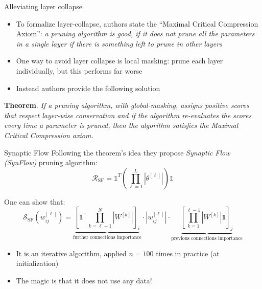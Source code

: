 \documentclass[10pt, handout]{beamer}
\begin{document}
\begin{frame}{Alleviating layer collapse}
    \begin{itemize}
        \pause\item To formalize layer-collapse, authors state the ``Maximal Critical Compression Axiom'': \textit{a pruning algorithm is good, if it does not prune all the parameters in a single layer if there is something left to prune in other layers}
        \pause\item One way to avoid layer collapse is local masking: prune each layer individually, but this performs far worse \cite{SynFlow}
        \pause\item Instead authors provide the following solution
    \end{itemize}
    \textbf{Theorem}. \textit{If a pruning algorithm, with global-masking, assigns positive scores that respect layer-wise conservation and if the algorithm re-evaluates the scores every time a parameter is pruned, then the algorithm satisfies the Maximal Critical Compression axiom.}
\end{frame}


\begin{frame}{Synaptic Flow}
    \pause
    Following the theorem's idea they propose \textit{Synaptic Flow (SynFlow)} pruning algorithm:
    \begin{equation}\label{eq:synflow-r-function}
\mathcal{R}_{\mathrm{SF}}=\mathds{1}^{T}\left(\prod_{\ell=1}^{L}\left|\theta^{[\ell]}\right|\right) \mathds{1}
\end{equation}
    
\pause
One can show that:
\begin{equation}\label{eq:synflow-score-function}
\mathcal{S}_{\mathrm{SF}}\left(w_{i j}^{[\ell]}\right)
=
\underbrace{\left[\mathds{1}^{\top} \prod_{k=\ell+1}^{N}\left|W^{[k]}\right|\right]_{i}}_{\text{further connections importance}}
\cdot
\left|w_{i j}^{[\ell]}\right|
\cdot
\underbrace{\left[\prod_{k=1}^{\ell-1}\left|W^{[k]}\right| \mathds{1}\right]_{j}}_{\text{previous connections importance}}
\end{equation}

\pause
\begin{itemize}
    \item\pause It is an iterative algorithm, applied $n=100$ times in practice (at initialization)
    \item\pause The magic is that it does not use any data!
\end{itemize}
\end{frame}
\end{document}
